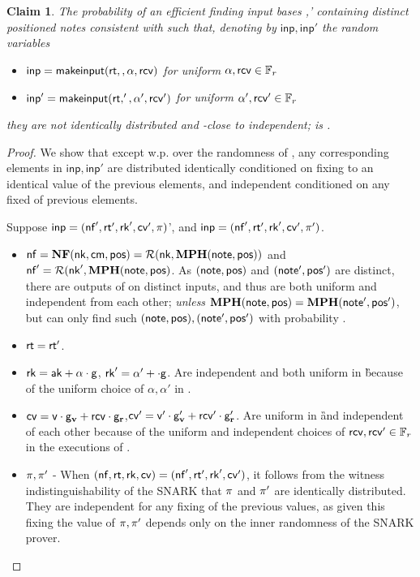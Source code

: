 \documentclass[11pt]{article}
\numberwithin{equation}{section} %
\numberwithin{figure}{section} %
\newtheorem{claim}[thm]{Claim}
\newcommand{\inp}{\ensuremath{\mathsf{inp}}\xspace}
\begin{document}
\begin{claim}\label{clm:inps-areind}
The probability of an efficient \adv finding input bases ,' containing distinct positioned notes consistent with \rt such that, denoting by $\inp,\inp'$ the random variables 
\begin{itemize}
 \item 
$\inp = \makeinput(\rt,,\alpha,\rcv)$ for uniform $\alpha,\mathsf{rcv} \in {\mathbb F}_r$
\item
$\inp' = \makeinput(\rt,',\alpha',\rcv')$ for uniform $\alpha',\mathsf{rcv}' \in {\mathbb F}_r$
\end{itemize}
they are not identically distributed and \negl-close to independent;
is \negl.

\end{claim}
\begin{proof}
We show that except w.p. \negl over the randomness of \adv, any corresponding elements in $\inp,\inp'$ are distributed identically conditioned on fixing to an identical value of the previous elements, and independent conditioned on any fixed of previous elements.
 
 Suppose $\inp=(\nf',\rt',\rk',\cv',\prf)$', and $\inp=(\nf',\rt',\rk',\cv',\prf')$.
 \begin{itemize}
  \item  $\mathsf{nf} = \mathbf{NF}(\mathsf{nk},\mathsf{cm},\mathsf{pos})=\mathcal R(\mathsf{nk},\mathbf{MPH}(\mathsf{note},\mathsf{pos}))$ and $\mathsf{nf}'=\mathcal R(\mathsf{nk}',\mathbf{MPH}(\mathsf{note},\mathsf{pos})$. As $(\mathsf{note},\mathsf{pos})$ and $(\mathsf{note}',\mathsf{pos}')$ are distinct, there are outputs of \RO on distinct inputs, and thus are both uniform and independent from each other; \emph{unless} $\mathbf{MPH}(\mathsf{note},\mathsf{pos}) = \mathbf{MPH}(\mathsf{note}',\mathsf{pos}')$, but \adv can only find
  such $(\mathsf{note},\mathsf{pos}),(\mathsf{note}',\mathsf{pos}')$ with probability \negl.
  \item $\mathsf{rt}=\mathsf{rt}'$.
  \item $\mathsf{rk}=\mathsf{ak} + \alpha\cdot \mathsf{g}$, $\mathsf{rk}' = \alpha' + \cdot \mathsf{g}$. Are independent and both uniform in \G because of the uniform choice of $\alpha,\alpha'$ in \makerandomizedtx.
  \item $\mathsf{cv}=\mathsf{v}\cdot \mathsf{g}_{\mathbf{v}} + \mathsf{rcv}\cdot \mathsf{g}_\mathbf{r}$,$\mathsf{cv}'=\mathsf{v}'\cdot \mathsf{g}_{\mathbf{v}}' + \mathsf{rcv}'\cdot \mathsf{g}_\mathbf{r}'$. Are uniform in \G and independent of each other because of the uniform and independent choices of $\mathsf{rcv},\mathsf{rcv}'\in {\mathbb F}_r$ in the executions of \makerandomizedtx.
  \item $\pi,\pi'$ - When  $(\mathsf{nf},\mathsf{rt},\mathsf{rk},\mathsf{cv})=(\mathsf{nf}',\mathsf{rt}',\mathsf{rk}',\mathsf{cv}')$, it follows from the witness indistinguishability of the SNARK
  that $\pi$ and $\pi'$ are identically distributed. They are independent for any fixing of the previous values, as given this fixing the value
  of $\pi,\pi'$ depends only on the inner randomness of the SNARK prover.
 \end{itemize}
 
\end{proof} 
\newcommand{\primeof}[1]{\ensuremath{#1 '}\xspace} 
\newcommand{\beforeout}[1]{\ensuremath{D^{\mathsf{out}}_{<#1}}\xspace}
\newcommand{\beforeoutprime}[1]{\ensuremath{D'^{\mathsf{out}}_{<#1}}\xspace}
\newcommand{\beforein}[1]{\ensuremath{D_{<#1}}\xspace}
\newcommand{\beforeinprime}[1]{\ensuremath{D'_{<#1}}\xspace}
\end{document}
